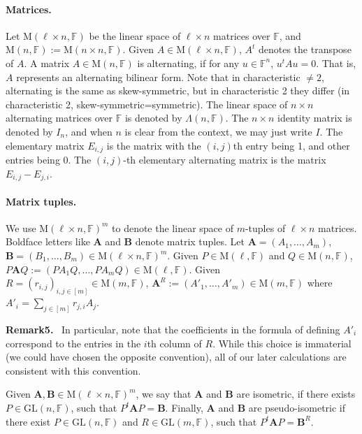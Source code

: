 \documentclass[10pt,a4paper]{article}
\newenvironment{authorclaim}[1]{\par\medskip\noindent\textbf{#1.}\ }{\par\medskip}
\begin{document}
\paragraph{Matrices.} Let $\mathrm M(\ell\times n,\mathbb F)$ be the linear space of $\ell\times n$ matrices over $\mathbb F$, and $\mathrm M(n,\mathbb F):=\mathrm M(n\times n,\mathbb F)$. Given $A\in\mathrm M(\ell\times n,\mathbb F)$, $A^t$ denotes the transpose of $A$.
A matrix $A\in\mathrm M(n,\mathbb F)$ is alternating, if for any $u\in\mathbb F^n$, $u^tAu=0$. That is, $A$ represents an alternating bilinear form. Note that in characteristic $\ne2$, alternating is the same as skew-symmetric, but in characteristic 2 they differ (in characteristic 2, skew-symmetric=symmetric). The linear space of $n\times n$ alternating matrices over $\mathbb F$ is denoted by $\Lambda(n,\mathbb F)$.
The $n\times n$ identity matrix is denoted by $I_n$, and when $n$ is clear from the context, we may just write $I$. The elementary matrix $E_{i,j}$ is the matrix with the $(i,j)$th entry being 1, and other entries being 0. The $(i,j)$-th elementary alternating matrix is the matrix $E_{i,j}-E_{j,i}$.
\paragraph{Matrix tuples.} We use $\mathrm M(\ell\times n,\mathbb F)^m$ to denote the linear space of $m$-tuples of $\ell\times n$ matrices. Boldface letters like $\mathbf A$ and $\mathbf B$ denote matrix tuples. Let $\mathbf A=(A_1,\ldots,A_m)$, $\mathbf B=(B_1,\ldots,B_m)\in\mathrm M(\ell\times n,\mathbb F)^m$. Given $P\in\mathrm M(\ell,\mathbb F)$ and $Q\in\mathrm M(n,\mathbb F)$, $P\mathbf A Q:=(PA_1Q,\ldots,PA_mQ)\in\mathrm M(\ell,\mathbb F)$. Given $R=(r_{i,j})_{i,j\in[m]}\in\mathrm M(m,\mathbb F)$, $\mathbf A^R:=(A'_1,\ldots,A'_m)\in\mathrm M(m,\mathbb F)$ where $A'_i=\sum_{j\in[m]}r_{j,i}A_j$.
\begin{authorclaim}{Remark5}
In particular, note that the coefficients in the formula of defining $A'_i$ correspond to the entries in the $i$th column of $R$. While this choice is immaterial (we could have chosen the opposite convention), all of our later calculations are consistent with this convention.
\end{authorclaim}
Given $\mathbf A,\mathbf B\in\mathrm M(\ell\times n,\mathbb F)^m$, we say that $\mathbf A$ and $\mathbf B$ are isometric, if there exists $P\in\mathrm{GL}(n,\mathbb F)$, such that $P^t\mathbf A P=\mathbf B$. Finally, $\mathbf A$ and $\mathbf B$ are pseudo-isometric if there exist $P\in\mathrm{GL}(n,\mathbb F)$ and $R\in\mathrm{GL}(m,\mathbb F)$, such that $P^t\mathbf A P=\mathbf B^R$.
\end{document}
